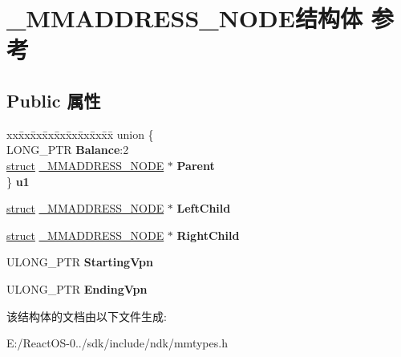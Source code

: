 \hypertarget{struct___m_m_a_d_d_r_e_s_s___n_o_d_e}{}\section{\+\_\+\+M\+M\+A\+D\+D\+R\+E\+S\+S\+\_\+\+N\+O\+D\+E结构体 参考}
\label{struct___m_m_a_d_d_r_e_s_s___n_o_d_e}
\subsection*{Public 属性}
\begin{DoxyCompactItemize}
\item 
\mbox{\label{struct___m_m_a_d_d_r_e_s_s___n_o_d_e_a184457410ad37b509209292fd4a69ab3}} 
\begin{tabbing}
xx\=xx\=xx\=xx\=xx\=xx\=xx\=xx\=xx\=\kill
union \{\\
\>LONG\_PTR {\bfseries Balance}:2\\
\>\hyperlink{interfacestruct}{struct} \hyperlink{struct___m_m_a_d_d_r_e_s_s___n_o_d_e}{\_MMADDRESS\_NODE} $\ast$ {\bfseries Parent}\\
\} {\bfseries u1}\\

\end{tabbing}\item 
\mbox{\label{struct___m_m_a_d_d_r_e_s_s___n_o_d_e_afb04a8127e7953776a867e233fd61ad9}} 
\hyperlink{interfacestruct}{struct} \hyperlink{struct___m_m_a_d_d_r_e_s_s___n_o_d_e}{\+\_\+\+M\+M\+A\+D\+D\+R\+E\+S\+S\+\_\+\+N\+O\+DE} $\ast$ {\bfseries Left\+Child}
\item 
\mbox{\label{struct___m_m_a_d_d_r_e_s_s___n_o_d_e_a42ffec1da639f36cbe4784b249880f23}} 
\hyperlink{interfacestruct}{struct} \hyperlink{struct___m_m_a_d_d_r_e_s_s___n_o_d_e}{\+\_\+\+M\+M\+A\+D\+D\+R\+E\+S\+S\+\_\+\+N\+O\+DE} $\ast$ {\bfseries Right\+Child}
\item 
\mbox{\label{struct___m_m_a_d_d_r_e_s_s___n_o_d_e_a00ee67be7e3b428104e31a49e6760c68}} 
U\+L\+O\+N\+G\+\_\+\+P\+TR {\bfseries Starting\+Vpn}
\item 
\mbox{\label{struct___m_m_a_d_d_r_e_s_s___n_o_d_e_ad227145550699c2457e88478b3da38bd}} 
U\+L\+O\+N\+G\+\_\+\+P\+TR {\bfseries Ending\+Vpn}
\end{DoxyCompactItemize}


该结构体的文档由以下文件生成\+:\begin{DoxyCompactItemize}
\item 
E\+:/\+React\+O\+S-\/0../sdk/include/ndk/mmtypes.\+h\end{DoxyCompactItemize}
